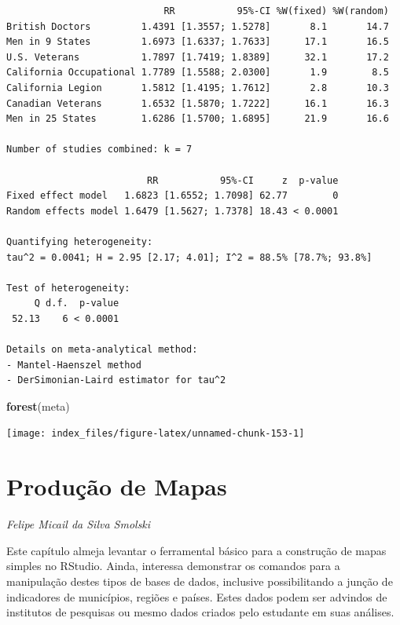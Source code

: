 \documentclass[12pt,brazil,oneside]{book}
\newenvironment{Shaded}{\begin{snugshade}}{\end{snugshade}}
\newcommand{\KeywordTok}[1]{\textcolor[rgb]{0.13,0.29,0.53}{\textbf{#1}}}
\newcommand{\NormalTok}[1]{#1}
\begin{document}
\begin{verbatim}
                            RR           95%-CI %W(fixed) %W(random)
British Doctors         1.4391 [1.3557; 1.5278]       8.1       14.7
Men in 9 States         1.6973 [1.6337; 1.7633]      17.1       16.5
U.S. Veterans           1.7897 [1.7419; 1.8389]      32.1       17.2
California Occupational 1.7789 [1.5588; 2.0300]       1.9        8.5
California Legion       1.5812 [1.4195; 1.7612]       2.8       10.3
Canadian Veterans       1.6532 [1.5870; 1.7222]      16.1       16.3
Men in 25 States        1.6286 [1.5700; 1.6895]      21.9       16.6

Number of studies combined: k = 7

                         RR           95%-CI     z  p-value
Fixed effect model   1.6823 [1.6552; 1.7098] 62.77        0
Random effects model 1.6479 [1.5627; 1.7378] 18.43 < 0.0001

Quantifying heterogeneity:
tau^2 = 0.0041; H = 2.95 [2.17; 4.01]; I^2 = 88.5% [78.7%; 93.8%]

Test of heterogeneity:
     Q d.f.  p-value
 52.13    6 < 0.0001

Details on meta-analytical method:
- Mantel-Haenszel method
- DerSimonian-Laird estimator for tau^2
\end{verbatim}

\begin{Shaded}
\begin{Highlighting}[]
\KeywordTok{forest}\NormalTok{(meta)}
\end{Highlighting}
\end{Shaded}

\begin{center}\texttt{[image: index\_files/figure-latex/unnamed-chunk-153-1]} \end{center}

\hypertarget{producao-de-mapas}{%
\chapter{Produção de Mapas}\label{producao-de-mapas}}

\emph{Felipe Micail da Silva Smolski}

\begin{flushright}
\emph{}
\end{flushright}

Este capítulo almeja levantar o ferramental básico para a construção de mapas simples no RStudio. Ainda, interessa demonstrar os comandos para a manipulação destes tipos de bases de dados, inclusive possibilitando a junção de indicadores de municípios, regiões e países. Estes dados podem ser advindos de institutos de pesquisas ou mesmo dados criados pelo estudante em suas análises.
\end{document}
